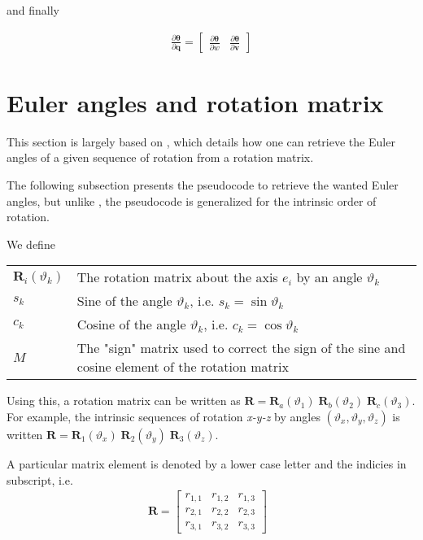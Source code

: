 \documentclass{article}
\renewcommand\aa{\bm{\theta}}
\renewcommand\t{\vartheta}
\newcommand\R{\bm{R}}
\newcommand\q{\bm{q}}
\renewcommand\v{\bm{v}}
\begin{document}
and finally

\begin{align}
  \frac{\partial \aa}{\partial \q} = 
    \begin{bmatrix}
      \frac{\partial \aa}{\partial w} &
      \frac{\partial \aa}{\partial \v}
    \end{bmatrix}
\end{align}

\section{Euler angles and rotation matrix}

This section is largely based on \cite{eberly_euler_nodate}, which details how
one can retrieve the Euler angles of a given sequence of rotation from a rotation matrix.

The following subsection presents the pseudocode to retrieve the wanted Euler angles, but 
unlike \cite{eberly_euler_nodate}, the pseudocode is generalized for the intrinsic order of rotation.

We define

\begin{tabular}{l p{15cm}}
  $\R_i(\t_k)$ & The rotation matrix about the axis $e_i$ by an angle $\t_k$ \\
  $s_k$ & Sine of the angle $\t_k$, i.e. $s_k = \sin \t_k$\\
  $c_k$ & Cosine of the angle $\t_k$, i.e. $c_k = \cos \t_k$\\
  $M$ & The "sign" matrix used to correct the sign of the sine and cosine element of the rotation matrix \\
\end{tabular}

Using this, a rotation matrix can be written as $\R = \R_a(\t_1) \; \R_b(\t_2) \; \R_c(\t_3)$.
For example, the intrinsic sequences of rotation \textit{x-y-z} by angles $(\t_x, \t_y, \t_z)$ is written
$\R = \R_1(\t_x) \; \R_2(\t_y) \; \R_3(\t_z)$.

A particular matrix element is denoted by a lower case letter and the indicies in subscript, i.e.
\begin{align}
  \R = \begin{bmatrix} 
    r_{1,1} & r_{1,2} & r_{1,3} \\
    r_{2,1} & r_{2,2} & r_{2,3} \\
    r_{3,1} & r_{3,2} & r_{3,3}
  \end{bmatrix} \text{       }
\end{align}
\end{document}
